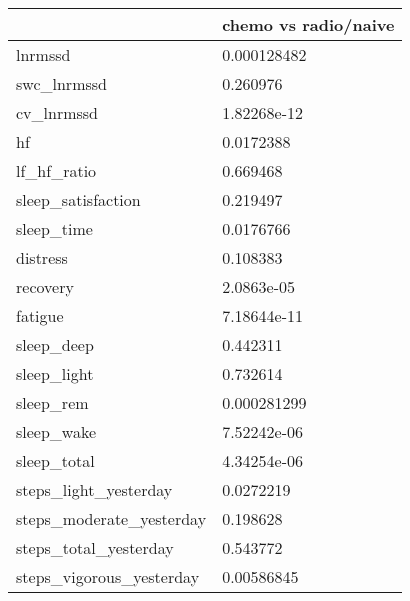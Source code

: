 \begin{tabular}{ll}
\toprule
{} & chemo vs radio/naive \\
\midrule
lnrmssd                  &          0.000128482 \\
swc\_lnrmssd              &             0.260976 \\
cv\_lnrmssd               &          1.82268e-12 \\
hf                       &            0.0172388 \\
lf\_hf\_ratio              &             0.669468 \\
sleep\_satisfaction       &             0.219497 \\
sleep\_time               &            0.0176766 \\
distress                 &             0.108383 \\
recovery                 &           2.0863e-05 \\
fatigue                  &          7.18644e-11 \\
sleep\_deep               &             0.442311 \\
sleep\_light              &             0.732614 \\
sleep\_rem                &          0.000281299 \\
sleep\_wake               &          7.52242e-06 \\
sleep\_total              &          4.34254e-06 \\
steps\_light\_yesterday    &            0.0272219 \\
steps\_moderate\_yesterday &             0.198628 \\
steps\_total\_yesterday    &             0.543772 \\
steps\_vigorous\_yesterday &           0.00586845 \\
\bottomrule
\end{tabular}
